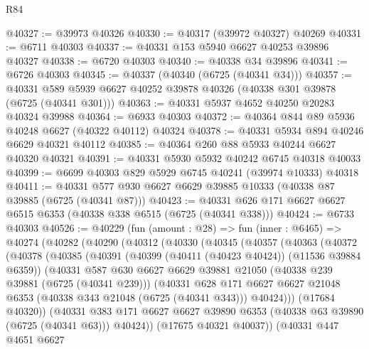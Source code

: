 \begin{lexlean}{R84}
\begin{coremodule}
@40327 := @39973 @40326
@40330 := @40317 (@39972 @40327) @40269
@40331 := @6711 @40303
@40337 := @40331 @153 @5940 @6627 @40253 @39896 @40327
@40338 := @6720 @40303
@40340 := @40338 @34 @39896
@40341 := @6726 @40303
@40345 := @40337 (@40340 (@6725 (@40341 @34)))
@40357 := @40331 @589 @5939 @6627 @40252 @39878 @40326 (@40338 @301 @39878 (@6725 (@40341 @301)))
@40363 := @40331 @5937 @4652 @40250 @20283 @40324 @39988
@40364 := @6933 @40303
@40372 := @40364 @844 @89 @5936 @40248 @6627 (@40322 @40112) @40324
@40378 := @40331 @5934 @894 @40246 @6629 @40321 @40112
@40385 := @40364 @260 @88 @5933 @40244 @6627 @40320 @40321
@40391 := @40331 @5930 @5932 @40242 @6745 @40318 @40033
@40399 := @6699 @40303 @829 @5929 @6745 @40241 (@39974 @10333) @40318
@40411 := @40331 @577 @930 @6627 @6629 @39885 @10333 (@40338 @87 @39885 (@6725 (@40341 @87)))
@40423 := @40331 @626 @171 @6627 @6627 @6515 @6353 (@40338 @338 @6515 (@6725 (@40341 @338)))
@40424 := @6733 @40303
@40526 := @40229
    (fun (amount : @28) =>
    fun (inner : @6465) =>
    @40274
      (@40282
        (@40290
          (@40312
            (@40330
              (@40345
                (@40357
                  (@40363
                    (@40372
                      (@40378
                        (@40385
                          (@40391
                            (@40399 (@40411 (@40423 @40424)) (@11536 @39884 @6359))
                            (@40331
                              @587
                              @630
                              @6627
                              @6629
                              @39881
                              @21050
                              (@40338 @239 @39881 (@6725 (@40341 @239)))
                              (@40331
                                @628
                                @171
                                @6627
                                @6627
                                @21048
                                @6353
                                (@40338 @343 @21048 (@6725 (@40341 @343)))
                                @40424)))
                          (@17684 @40320))
                        (@40331
                          @383
                          @171
                          @6627
                          @6627
                          @39890
                          @6353
                          (@40338 @63 @39890 (@6725 (@40341 @63)))
                          @40424))
                      (@17675 @40321 @40037))
                    (@40331
                      @447
                      @4651
                      @6627

\end{coremodule}
\end{lexlean}
